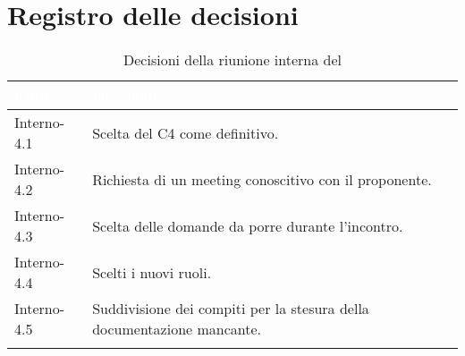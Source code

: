 \section{Registro delle decisioni}
{
\renewcommand{\arraystretch}{1.5}
\centering
\begin{longtable}{C{3cm} C{9cm}}
\textcolor{white}{\textbf{Codice}}&
\textcolor{white}{\textbf{Decisione}}\\	
\endhead
		
Interno-4.1 & Scelta del  C4 come definitivo.\\

Interno-4.2 & Richiesta di un meeting conoscitivo con il proponente.\\

Interno-4.3 & Scelta delle domande da porre durante l'incontro.\\

Interno-4.4 & Scelti i nuovi ruoli.\\

Interno-4.5 & Suddivisione dei compiti per la stesura della documentazione mancante.\\
		
\caption{Decisioni della riunione interna del \Data{}}
\end{longtable}
}
